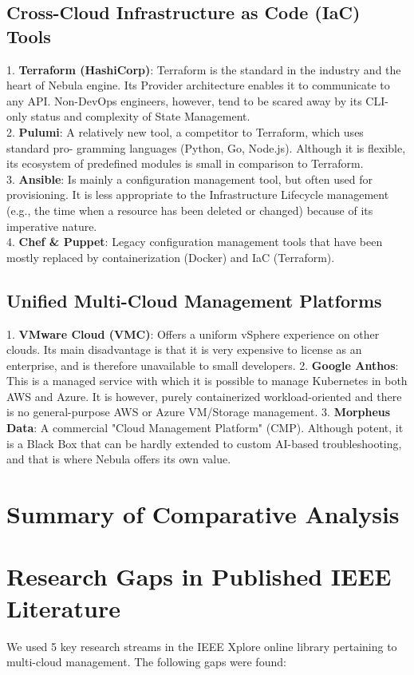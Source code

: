 \subsection{Cross-Cloud Infrastructure as Code (IaC) Tools}
1. \textbf{Terraform (HashiCorp)}: Terraform is the standard in the industry and the heart of Nebula engine. Its Provider architecture enables it to communicate to any API. Non-DevOps engineers, however, tend to be scared away by its CLI-only status and complexity of State Management. \\
2. \textbf{Pulumi}: A relatively new tool, a competitor to Terraform, which uses standard pro- gramming languages (Python, Go, Node.js). Although it is flexible, its ecosystem of predefined modules is small in comparison to Terraform. \\
3. \textbf{Ansible}: Is mainly a configuration management tool, but often used for provisioning. It is less appropriate to the Infrastructure Lifecycle management (e.g., the time when a resource has been deleted or changed) because of its imperative nature.
 \\
4. \textbf{Chef \& Puppet}: Legacy configuration management tools that have been mostly replaced by containerization (Docker) and IaC (Terraform).


\subsection{Unified Multi-Cloud Management Platforms}
1. \textbf{VMware Cloud (VMC)}: Offers a uniform vSphere experience on other clouds. Its main disadvantage is that it is very expensive to license as an enterprise, and is therefore unavailable to small developers.
2. \textbf{Google Anthos}: This is a managed service with which it is possible to manage Kubernetes in both AWS and Azure. It is however, purely containerized workload-oriented and there is no general-purpose AWS or Azure VM/Storage management.
3. \textbf{Morpheus Data}: A commercial "Cloud Management Platform" (CMP). Although potent, it is a Black Box that can be hardly extended to custom AI-based troubleshooting, and that is where Nebula offers its own value.

\section{Summary of Comparative Analysis}

\section{Research Gaps in Published IEEE Literature}
We used 5 key research streams in the IEEE Xplore online library pertaining to multi-cloud management. The following gaps were found:

